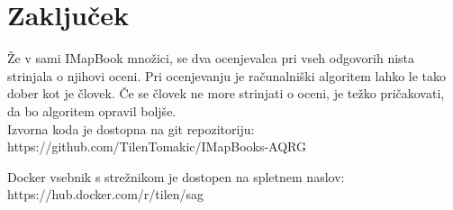 \documentclass[journal]{IEEEtran}
\begin{document}
\section{Zaključek}
Že v sami IMapBook množici, se dva ocenjevalca pri vseh odgovorih nista strinjala o njihovi oceni. Pri ocenjevanju je računalniški algoritem lahko le tako dober kot je človek. Če se človek ne more strinjati o oceni, je težko pričakovati, da bo algoritem opravil boljše.\\

Izvorna koda je dostopna na git repozitoriju: https://github.com/TilenTomakic/IMapBooks-AQRG

Docker vsebnik s strežnikom je dostopen na spletnem naslov:
https://hub.docker.com/r/tilen/sag

\ifCLASSOPTIONcaptionsoff
  \newpage
\fi



\end{document}
